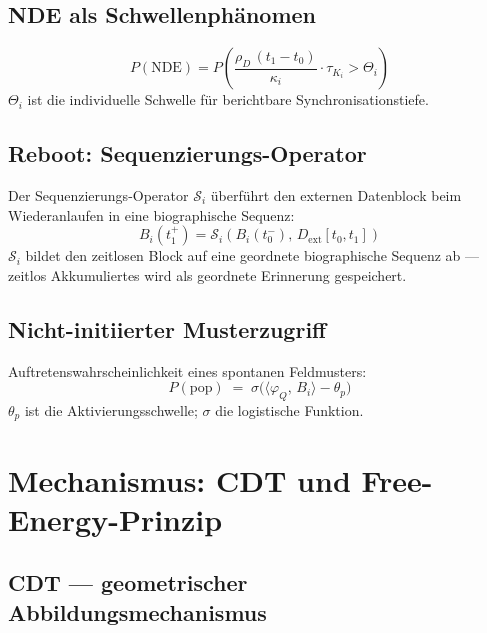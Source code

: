 \documentclass[11pt,a4paper]{article}
\begin{document}
\subsection*{NDE als Schwellenphänomen}

\begin{equation}
  P(\mathrm{NDE}) = P\!\left(
    \frac{\rho_D\,(t_1-t_0)}{\kappa_i}\cdot\tau_{K_i}
    > \Theta_i
  \right)
  \label{eq:nde_prob}
\end{equation}
$\Theta_i$ ist die individuelle Schwelle für berichtbare Synchronisationstiefe.

\subsection*{Reboot: Sequenzierungs-Operator}

Der Sequenzierungs-Operator $\mathcal{S}_i$ überführt den externen Datenblock
beim Wiederanlaufen in eine biographische Sequenz:
\begin{equation}
  B_i(t_1^+) =
  \mathcal{S}_i\!\left(B_i(t_0^-),\,D_{\mathrm{ext}}[t_0,t_1]\right)
  \label{eq:nde_reboot}
\end{equation}
$\mathcal{S}_i$ bildet den zeitlosen Block auf eine geordnete biographische
Sequenz ab — zeitlos Akkumuliertes wird als geordnete Erinnerung gespeichert.

\subsection*{Nicht-initiierter Musterzugriff}

Auftretenswahrscheinlichkeit eines spontanen Feldmusters:
\begin{equation}
  P(\mathrm{pop}) \;=\; \sigma\!\bigl(\langle \varphi_Q,\, B_i \rangle - \theta_p\bigr)
  \label{eq:mindpop_prob}
\end{equation}
$\theta_p$ ist die Aktivierungsschwelle; $\sigma$ die logistische Funktion.

\section{Mechanismus: CDT und Free-Energy-Prinzip}
\label{app:mechanismus}

\subsection*{CDT — geometrischer Abbildungsmechanismus}
\end{document}
